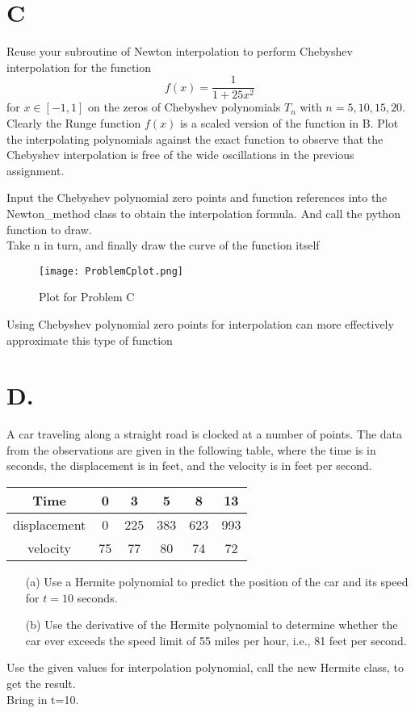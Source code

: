 \documentclass[a4paper]{article}
\begin{document}
    
    \section*{C}
    Reuse your subroutine of Newton interpolation to perform Chebyshev interpolation for the function
    \[
    f(x) = \frac{1}{1 + 25x^2}
    \]
    for $x \in [-1, 1]$ on the zeros of Chebyshev polynomials $T_n$ with $n = 5, 10, 15, 20$. Clearly the Runge function $f(x)$ is a scaled version of the function in B. Plot the interpolating polynomials against the exact function to observe that the Chebyshev interpolation is free of the wide oscillations in the previous assignment.
    
    Input the Chebyshev polynomial zero points and function references into the Newton\_method class to obtain the interpolation formula.
    And call the python function to draw. \\
    Take n in turn, and finally draw the curve of the function itself \\
    \begin{figure}[H]
        \centering 
        \texttt{[image: ProblemCplot.png]} 
        \caption{Plot for Problem C} 
    \end{figure}
    Using Chebyshev polynomial zero points for interpolation can more effectively approximate this type of function\\
    
    
    \section*{D.}
    A car traveling along a straight road is clocked at a number of points. The data from the observations are given in the following table, where the time is in seconds, the displacement is in feet, and the velocity is in feet per second.
    
    \begin{table}[H]
        \centering
        \begin{tabular}{@{}cccccc@{}}
            \toprule
            Time & 0 & 3 & 5 & 8 & 13 \\ \midrule
            displacement & 0 & 225 & 383 & 623 & 993 \\
            velocity & 75 & 77 & 80 & 74 & 72 \\ \bottomrule
        \end{tabular}
    \end{table}
    
    \begin{enumerate}
        \item[(a)] Use a Hermite polynomial to predict the position of the car and its speed for $t = 10$ seconds.
        \item[(b)] Use the derivative of the Hermite polynomial to determine whether the car ever exceeds the speed limit of 55 miles per hour, i.e., 81 feet per second.
    \end{enumerate}
    Use the given values for interpolation polynomial, call the new Hermite class, to get the result. \\
    Bring in t=10.\\
    
\end{document}
